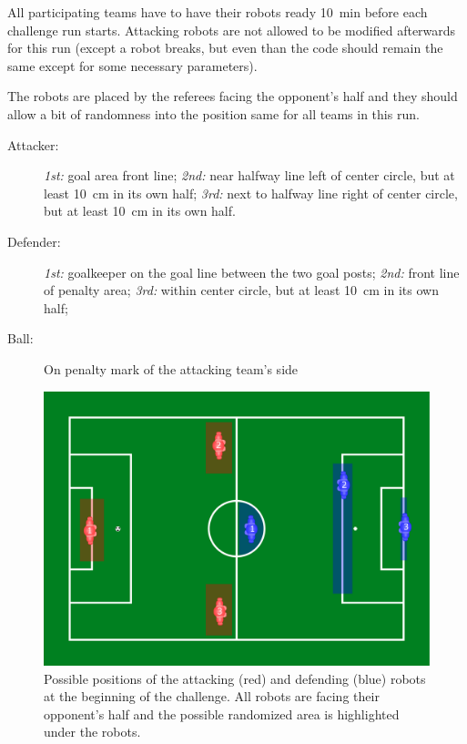 All participating teams have to have their robots ready \qty{10}{\minute} before each challenge run starts. Attacking robots are not allowed to be modified afterwards for this run (except a robot breaks, but even than the code should remain the same except for some necessary parameters).

The robots are placed by the referees facing the opponent's half and they should allow a bit of randomness into the position same for all teams in this run.
\begin{description}
	\item[Attacker:] \textit{1st:} goal area front line; \textit{2nd:} near halfway line left of center circle, but at least \qty{10}{\cm} in its own half; \textit{3rd:} next to halfway line right of center circle, but at least \qty{10}{\cm} in its own half.
	\item[Defender:] \textit{1st:} goalkeeper on the goal line between the two goal posts; \textit{2nd:} front line of penalty area; \textit{3rd:} within center circle, but at least \qty{10}{\cm} in its own half; 
	\item[Ball:] On penalty mark of the attacking team's side
\end{description}

\begin{figure}[hb!]
	\begin{center}
		\leavevmode
		\includegraphics[width=1\columnwidth]{figs/dbhc_initial.pdf}
		\caption{Possible positions of the {\color{red}attacking (red)} and {\color{blue}defending (blue)} robots at the beginning of the challenge. All robots are facing their opponent's half and the possible randomized area is highlighted under the robots.}
		\label{fig:ball_handling_inital_positions}
	\end{center}
\end{figure}

